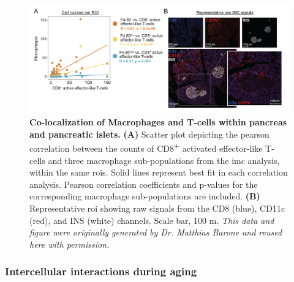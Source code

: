 \begin{figure}[t!]
\centering
\includegraphics[width=\linewidth]{Chapter4/Fig/F2-8-01.png}
\caption[Co-localization of macrophages and T-cells within pancreas]{\textbf{Co-localization of Macrophages and T-cells within pancreas and pancreatic islets.} \textbf{(A)} Scatter plot depicting the pearson correlation between the counts of CD8\textsuperscript{+} activated effector-like T-cells and three macrophage sub-populations from the \gls{imc} analysis, within the same \glspl{roi}. Solid lines represent best fit in each correlation analysis. Pearson correlation coefficients and p-values for the corresponding macrophage sub-populations are included. \textbf{(B)} Representative \gls{roi} showing raw signals from the CD8 (blue), CD11c (red), and INS (white) channels. Scale bar, 100 \textmu m. \textit{This data and figure were originally generated by Dr. Matthias Barone and reused here with permission.}}
\label{fig:chp2_imc_correlation}

\end{figure}


\subsubsection{\large Intercellular interactions during aging}


